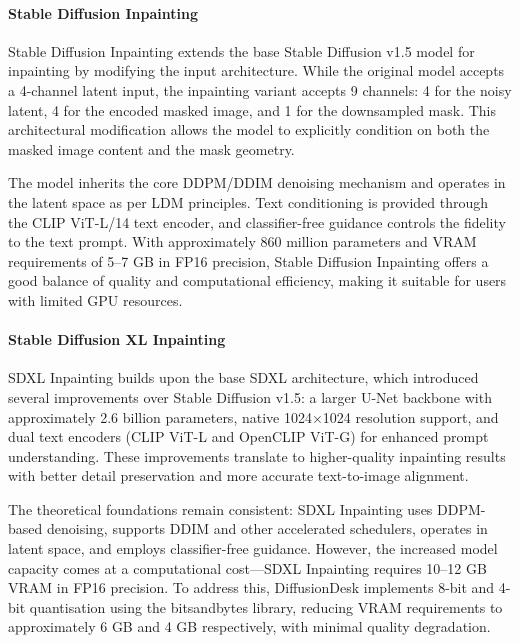 \documentclass[12pt,a4paper]{report}
\begin{document}
\paragraph{Stable Diffusion Inpainting}

Stable Diffusion Inpainting \citep{rombach2022ldm} extends the base Stable Diffusion v1.5 model for inpainting by modifying the input architecture. While the original model accepts a 4-channel latent input, the inpainting variant accepts 9 channels: 4 for the noisy latent, 4 for the encoded masked image, and 1 for the downsampled mask. This architectural modification allows the model to explicitly condition on both the masked image content and the mask geometry.

The model inherits the core DDPM/DDIM denoising mechanism and operates in the latent space as per LDM principles. Text conditioning is provided through the CLIP ViT-L/14 text encoder, and classifier-free guidance controls the fidelity to the text prompt. With approximately 860 million parameters and VRAM requirements of 5--7 GB in FP16 precision, Stable Diffusion Inpainting offers a good balance of quality and computational efficiency, making it suitable for users with limited GPU resources.

\paragraph{Stable Diffusion XL Inpainting}

SDXL Inpainting builds upon the base SDXL architecture, which introduced several improvements over Stable Diffusion v1.5: a larger U-Net backbone with approximately 2.6 billion parameters, native 1024$\times$1024 resolution support, and dual text encoders (CLIP ViT-L and OpenCLIP ViT-G) for enhanced prompt understanding. These improvements translate to higher-quality inpainting results with better detail preservation and more accurate text-to-image alignment.

The theoretical foundations remain consistent: SDXL Inpainting uses DDPM-based denoising, supports DDIM and other accelerated schedulers, operates in latent space, and employs classifier-free guidance. However, the increased model capacity comes at a computational cost---SDXL Inpainting requires 10--12 GB VRAM in FP16 precision. To address this, DiffusionDesk implements 8-bit and 4-bit quantisation using the bitsandbytes library, reducing VRAM requirements to approximately 6 GB and 4 GB respectively, with minimal quality degradation.
\end{document}
